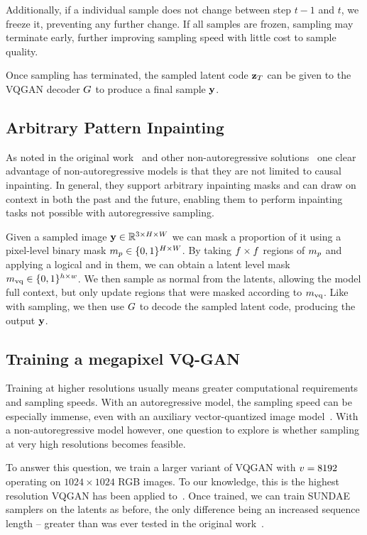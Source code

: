 Additionally, if a individual sample does not change between step $t-1$ and $t$,
we freeze it, preventing any further change. If all samples are frozen, sampling
may terminate early, further improving sampling speed with little cost to
sample quality.

Once sampling has terminated, the sampled latent code $\mathbf{z}_T$ can be given
to the VQGAN decoder $G$ to produce a final sample $\mathbf{y}$.

\subsection{Arbitrary Pattern Inpainting}
As noted in the original work~\cite{savinov2022stepunrolled} and other
non-autoregressive solutions~\cite{bondtaylor2021unleashing} one clear advantage
of non-autoregressive models is that they are not limited to causal inpainting.
In general, they support arbitrary inpainting masks and can draw on context in
both the past and the future, enabling them to perform inpainting tasks not
possible with autoregressive sampling.

Given a sampled image $\mathbf{y} \in \mathbb{R}^{3 \times H \times W}$ we can mask a
proportion of it using a pixel-level binary mask $m_p \in \{0, 1\}^{H
\times W}$. By taking $f \times f$ regions of
$m_p$ and applying a logical and in them, we can obtain a latent level
mask $m_\textrm{vq} \in \{0,1\}^{h \times w}$. We then sample as normal from the
latents, allowing the model full context, but only update regions that were
masked according to $m_\textrm{vq}$. Like with sampling, we then use $G$
to decode the sampled latent code, producing the output $\mathbf{y}$.

\subsection{Training a megapixel VQ-GAN}

Training at higher resolutions usually means greater computational requirements
and sampling speeds. With an autoregressive model, the sampling speed can be
especially immense, even with an auxiliary vector-quantized image
model~\cite{esser2021taming}. With a non-autoregressive model however, one
question to explore is whether sampling at very high resolutions becomes
feasible.

To answer this question, we train a larger variant of VQGAN with
$v = 8192$ operating on $1024 \times 1024$ RGB images. To our
knowledge, this is the highest resolution VQGAN has been applied
to~\cite{esser2021taming}. Once trained, we can train SUNDAE samplers on the
latents as before, the only difference being an increased sequence length --
greater than was ever tested in the original
work~\cite{savinov2022stepunrolled}.

\label{sec:megagan}
